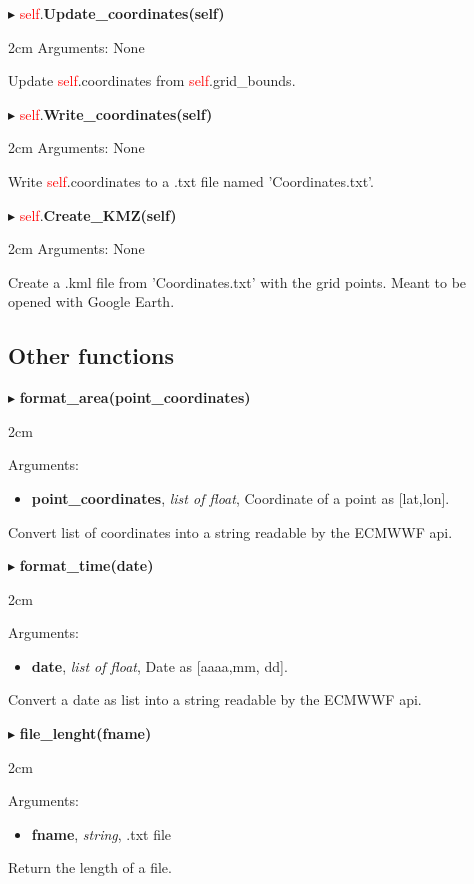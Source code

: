 \documentclass[12pt]{article}
\newenvironment{myenv}{\begin{adjustwidth}{2cm}{}}{\end{adjustwidth}}
\newcommand{\ClassFunction}[3]{\filbreak\noindent
$\blacktriangleright$ \quad \textcolor{red}{self}.\textbf{#1}

\begin{myenv}
Arguments: {#2}

{#3}
\end{myenv}
\vspace*{0.4 cm}}
\newcommand{\Function}[3]{\filbreak\noindent
$\blacktriangleright$ \quad\textbf{#1}
\begin{myenv}

Arguments: {#2}

{#3}
\end{myenv}
\vspace*{0.4 cm}}
\newcommand{\Argument}[3]{\noindent
\textbf{#1}, \textit{#2}, {#3}}
\begin{document}
\ClassFunction{Update\_coordinates(self)}{None}{Update \textcolor{red}{self}.coordinates from \textcolor{red}{self}.grid\_bounds.}

\ClassFunction{Write\_coordinates(self)}{None}{Write \textcolor{red}{self}.coordinates to a .txt file named 'Coordinates.txt'.}

\ClassFunction{Create\_KMZ(self)}{None}{Create a .kml file from 'Coordinates.txt' with the grid points. Meant to be opened with Google Earth.}

\subsection{Other functions}

\Function{format\_area(point\_coordinates)}{
\begin{itemize}
\item \Argument{point\_coordinates}{list of float}{Coordinate of a point as [lat,lon].}
\end{itemize}}{Convert list of coordinates into a string readable by the ECMWWF api.}

\Function{format\_time(date)}{
\begin{itemize}
\item \Argument{date}{list of float}{Date as [aaaa,mm, dd].}
\end{itemize}}{Convert a date as list into a string readable by the ECMWWF api.}

\Function{file\_lenght(fname)}{
\begin{itemize}
\item \Argument{fname}{string}{.txt file}
\end{itemize}}{Return the length of a file.}
\end{document}
